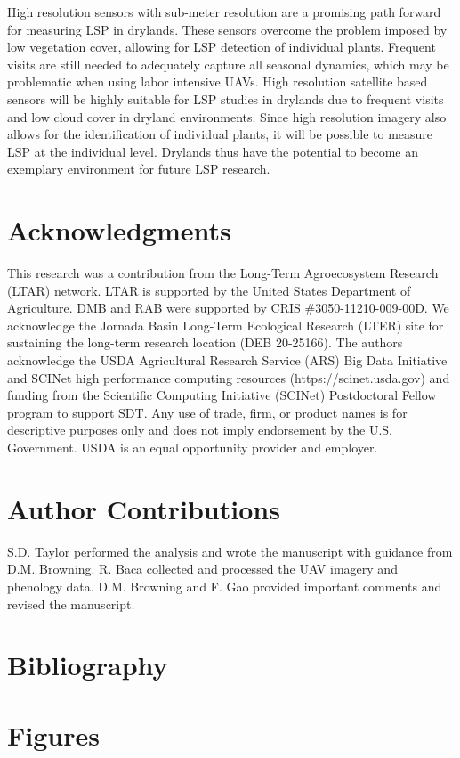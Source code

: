 \documentclass{article}
\begin{document}
High resolution sensors with sub-meter resolution are a promising path forward for measuring LSP in drylands. These sensors overcome the problem imposed by low vegetation cover, allowing for LSP detection of individual plants. Frequent visits are still needed to adequately capture all seasonal dynamics, which may be problematic when using labor intensive UAVs. High resolution satellite based sensors will be highly suitable for LSP studies in drylands due to frequent visits and low cloud cover in dryland environments. Since high resolution imagery also allows for the identification of individual plants, it will be possible to measure LSP at the individual level. Drylands thus have the potential to become an exemplary environment for future LSP research. 

\section*{Acknowledgments}
This research was a contribution from the Long-Term Agroecosystem Research (LTAR) network. LTAR is supported by the United States Department of Agriculture. DMB and RAB were supported by CRIS \#3050-11210-009-00D. We acknowledge the Jornada Basin Long-Term Ecological Research (LTER) site for sustaining the long-term research location (DEB 20-25166). The authors acknowledge the USDA Agricultural Research Service (ARS) Big Data Initiative and SCINet high performance computing resources (https://scinet.usda.gov) and funding from the Scientific Computing Initiative (SCINet) Postdoctoral Fellow program to support SDT. Any use of trade, firm, or product names is for descriptive purposes only and does not imply endorsement by the U.S. Government. USDA is an equal opportunity provider and employer.


\section*{Author Contributions} 
S.D. Taylor performed the analysis and wrote the manuscript with guidance from D.M. Browning. R. Baca collected and processed the UAV imagery and phenology data. D.M. Browning and F. Gao provided important comments and revised the manuscript.


\section{Bibliography}
\printbibliography

\section*{Figures}
\end{document}
